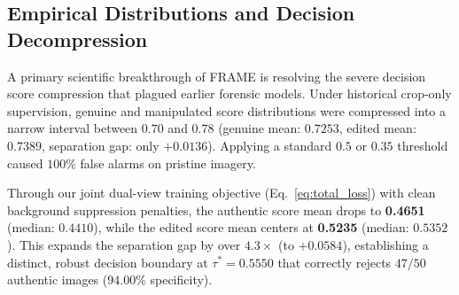\begin{table}[t]
\centering\small
\caption{Inference latency (ms), frame throughput (FPS), and peak GPU memory footprint (MB) across computational tiers.}
\label{tab:hardware_profile}
\end{table}

\subsection{Empirical Distributions and Decision Decompression}
\label{sec:empirical_distributions}

A primary scientific breakthrough of FRAME is resolving the severe decision score compression that plagued earlier forensic models. Under historical crop-only supervision, genuine and manipulated score distributions were compressed into a narrow interval between $0.70$ and $0.78$ (genuine mean: $0.7253$, edited mean: $0.7389$, separation gap: only $+0.0136$). Applying a standard $0.5$ or $0.35$ threshold caused $100\%$ false alarms on pristine imagery.

Through our joint dual-view training objective (Eq.~\eqref{eq:total_loss}) with clean background suppression penalties, the authentic score mean drops to \textbf{0.4651} (median: $0.4410$), while the edited score mean centers at \textbf{0.5235} (median: $0.5352$). This expands the separation gap by over \textbf{$4.3\times$} (to $+0.0584$), establishing a distinct, robust decision boundary at $\tau^* = 0.5550$ that correctly rejects $47/50$ authentic images ($94.00\%$ specificity).

